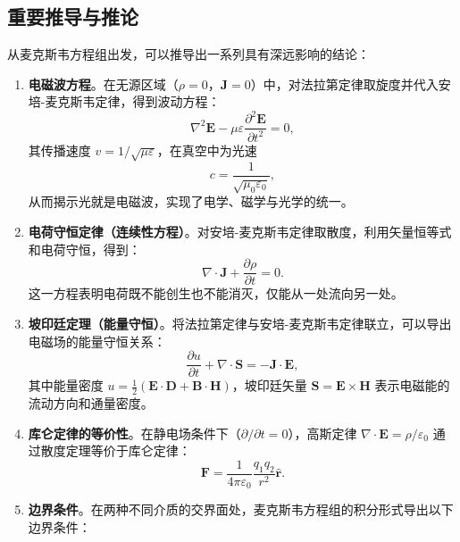 \documentclass{ctexart} %
\begin{document}
\subsection*{重要推导与推论}
从麦克斯韦方程组出发，可以推导出一系列具有深远影响的结论：
\begin{enumerate}
    \item \textbf{电磁波方程}。在无源区域（$\rho = 0$，$\mathbf{J} = 0$）中，对法拉第定律取旋度并代入安培-麦克斯韦定律，得到波动方程：
    \begin{equation}
        \nabla^2 \mathbf{E} - \mu\varepsilon \frac{\partial^2 \mathbf{E}}{\partial t^2} = 0,
        \label{eq:wave}
    \end{equation}
    其传播速度 $v = 1/\sqrt{\mu\varepsilon}$，在真空中为光速
    \begin{equation}
        c = \frac{1}{\sqrt{\mu_0\varepsilon_0}},
        \label{eq:c}
    \end{equation}
    从而揭示光就是电磁波，实现了电学、磁学与光学的统一\cite{maxwell1865,griffiths2017}。
    \item \textbf{电荷守恒定律（连续性方程）}。对安培-麦克斯韦定律取散度，利用矢量恒等式和电荷守恒，得到：
    \begin{equation}
        \nabla \cdot \mathbf{J} + \frac{\partial \rho}{\partial t} = 0.
        \label{eq:continuity}
    \end{equation}
    这一方程表明电荷既不能创生也不能消灭，仅能从一处流向另一处。
    \item \textbf{坡印廷定理（能量守恒）}。将法拉第定律与安培-麦克斯韦定律联立，可以导出电磁场的能量守恒关系：
    \begin{equation}
        \frac{\partial u}{\partial t} + \nabla \cdot \mathbf{S} = -\mathbf{J} \cdot \mathbf{E},
        \label{eq:poynting}
    \end{equation}
    其中能量密度 $u = \frac{1}{2}(\mathbf{E} \cdot \mathbf{D} + \mathbf{B} \cdot \mathbf{H})$，坡印廷矢量 $\mathbf{S} = \mathbf{E} \times \mathbf{H}$ 表示电磁能的流动方向和通量密度\cite{griffiths2017}。
    \item \textbf{库仑定律的等价性}。在静电场条件下（$\partial/\partial t = 0$），高斯定律 $\nabla \cdot \mathbf{E} = \rho/\varepsilon_0$ 通过散度定理等价于库仑定律：
    \begin{equation}
        \mathbf{F} = \frac{1}{4\pi\varepsilon_0}\frac{q_1 q_2}{r^2}\hat{\mathbf{r}}.
        \label{eq:coulomb}
    \end{equation}
    \item \textbf{边界条件}。在两种不同介质的交界面处，麦克斯韦方程组的积分形式导出以下边界条件：

\end{enumerate}
\end{document}
